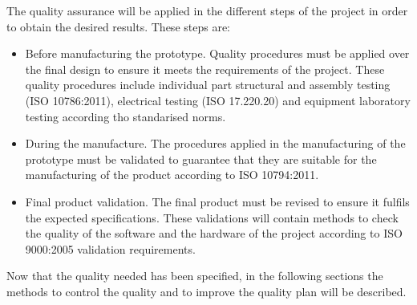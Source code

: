 The quality assurance will be applied in the different steps of the project in order to obtain the desired results. These steps are:
\begin{itemize}
	\item  Before manufacturing the prototype. Quality procedures must be applied over the final design to ensure it meets the requirements of the project. These quality procedures include individual part structural  and assembly testing (ISO 10786:2011), electrical testing (ISO 17.220.20) and equipment laboratory testing according tho standarised norms.
	\item During the manufacture. The procedures applied in the manufacturing of the prototype must be validated to guarantee that they are suitable for the manufacturing of the product according to ISO 10794:2011.
	\item Final product validation. The final product must be revised to ensure it fulfils the expected specifications. These validations will contain methods to check the quality of the software and the hardware of the project according to ISO 9000:2005 validation requirements.
\end{itemize} 
Now that the quality needed has been specified, in the following sections the methods to control the quality and to improve the quality plan will be described.